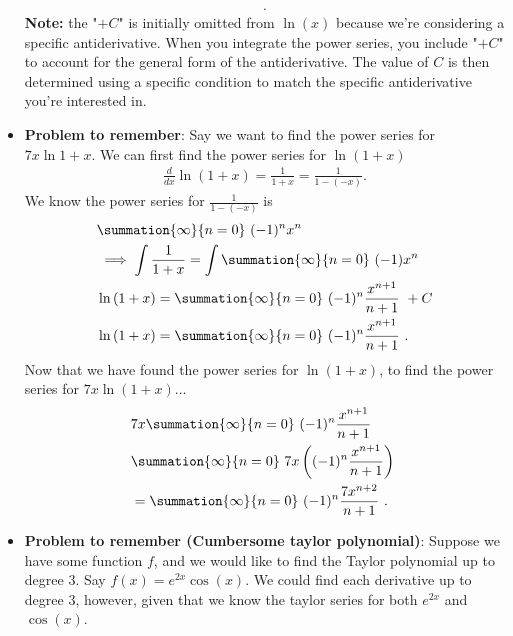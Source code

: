 \documentclass{report}
\begin{document}
\begin{itemize}
\begin{align*}
                .\end{align*}
                \textbf{Note:} the "$+C$" is initially omitted from $\ln{(x)}$ because we're considering a specific antiderivative. When you integrate the power series, you include "$+C$" to account for the general form of the antiderivative. The value of  $C$ is then determined using a specific condition to match the specific antiderivative you're interested in.
            \item \textbf{Problem to remember}: Say we want to find the power series for $7x\ln{1+x}$. We can first find the power series for $\ln{(1+x)} $
                \begin{align*}
                    \frac{d}{dx} \ln{(1+x)} = \frac{1}{1+x} = \frac{1}{1-(-x)}
                .\end{align*}
                We know the power series for  $\frac{1}{1-(-x)} $ is
                \begin{align*}
                    &\summation{\infty}{n=0}\ (-1)^{n}x^{n}\  \\
                    &\implies \int \frac{1}{1+x} = \int \summation{\infty}{n=0}\ (-1)x^{n}\   \\
                    &\ln{(1+x)} = \summation{\infty}{n=0}\ (-1)^{n}\frac{x^{n+1}}{n+1}\  + C  \\
                    &\ln{(1+x)} = \summation{\infty}{n=0}\ (-1)^{n}\frac{x^{n+1}}{n+1}\ 
                .\end{align*}
                Now that we have found the power series for $\ln{(1+x)}$, to find the power series for $7x\ln{(1+x)}$...
                \begin{align*}
                    &7x\summation{\infty}{n=0}\ (-1)^{n}\frac{x^{n+1}}{n+1}\  \\
                    &\summation{\infty}{n=0}\ 7x\left((-1)^{n}\frac{x^{n+1}}{n+1}\right)\  \\
                    &=\summation{\infty}{n=0}\ (-1)^{n}\frac{7x^{n+2}}{n+1}\ 
                .\end{align*}
                \pagebreak \bigbreak \noindent 
            \item \textbf{Problem to remember (Cumbersome taylor polynomial)}: Suppose we have some function $f$, and we would like to find the Taylor polynomial up to degree $3$. Say $f(x) = e^{2x}\cos{(x)}$. We could find each derivative up to degree 3, however, given that we know the taylor series for both $e^{2x}$ and $\cos{(x)}$.
                \begin{align*}

\end{align*}
\end{itemize}
\end{document}
